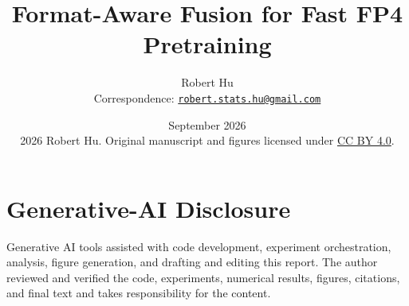 \documentclass[11pt]{article}
\title{Format-Aware Fusion for Fast FP4 Pretraining}
\author{Robert Hu\\[1mm]
\small\mdseries Correspondence:
\href{mailto:robert.stats.hu@gmail.com}{\nolinkurl{robert.stats.hu@gmail.com}}}
\date{September 2026\\[3mm]
\small \textcopyright{} 2026 Robert Hu. Original manuscript and figures
licensed under \href{https://creativecommons.org/licenses/by/4.0/}{CC BY 4.0}.}
\begin{document}
\maketitle










\section*{Generative-AI Disclosure}

Generative AI tools assisted with code development, experiment orchestration,
analysis, figure generation, and drafting and editing this report. The author
reviewed and verified the code, experiments, numerical results, figures,
citations, and final text and takes responsibility for the content.




\appendix



\end{document}
